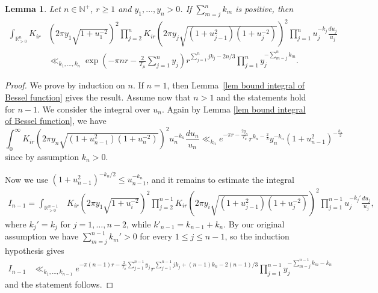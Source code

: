 \documentclass[10pt,a4paper]{amsart}
\newtheorem{lemma}{Lemma}
\newcommand{\N}{\mathbb{N}}
\newcommand{\R}{\mathbb{R}}
\begin{document}
\begin{lemma}
Let $n\in\N^+$, $r\geq1$ and $y_1,\dots,y_n>0$.
If
$\sum_{m=j}^nk_m$ is positive, then
\begin{align*}
\int_{\R_{>0}^n}K_{ir}&\left(2\pi y_1\sqrt{1+u_1^{-2}}\right)^2
\prod_{j=2}^nK_{ir}\left(2\pi y_j\sqrt{(1+u_{j-1}^2)(1+u_j^{-2})}\right)^2
\prod_{j=1}^nu_j^{-k_j}\frac{du_j}{u_j}\\
    &\ll_{k_1,\dots,k_n}
    \exp\left(-\pi nr-\frac2{T_\mu}\sum_{j=1}^n y_j\right)r^{\sum_{j=1}^n jk_j-2n/3}\prod_{j=1}^ny_j^{-\sum_{m=j}^nk_m}.
\end{align*}
\end{lemma}

\begin{proof}
We prove by induction on $n$. If $n=1$, then   Lemma~\ref{lem bound integral of Bessel function} 
gives the result.
Assume now that $n>1$ and the statements hold for $n-1$. We consider the integral over $u_n$. Again by Lemma \ref{lem bound integral of Bessel function}, we have
\[
\int_0^\infty K_{ir}\left(2\pi y_n\sqrt{(1+u_{n-1}^2)(1+u_n^{-2})}\right)^2u_n^{-k_n}\frac{du_n}{u_n}
\ll_{k_n}e^{-\pi r-\frac{2y_n}{T_\mu}}r^{k_n-\frac23}y_n^{-k_n}(1+u_{n-1}^2)^{-\frac{k_n}{2}}
\]
since by assumption $k_n>0$.

Now
we use $(1+u_{n-1}^2)^{-k_n/2}\leq u_{n-1}^{-k_n}$, and it remains
to estimate the integral 
\begin{align*}
I_{n-1}=\int_{\R_{>0}^{n-1}}&K_{ir}\left(2\pi y_1\sqrt{1+u_i^{-2}}\right)^2\prod_{j=2}^{n-1}K_{ir}\left(2\pi y_i\sqrt{(1+u_{j-1}^2)(1+u_j^{-2})}\right)^2\prod_{j=1}^{n-1}u_j^{-k_j'}\frac{du_j}{u_j},
\end{align*}
where $k_j'=k_j$ for $j=1,\dots,n-2$, while $k'_{n-1}=k_{n-1}+k_n$.  By
our original assumption we have 
$\sum_{m=j}^{n-1}k_m'>0$
for every $1\leq j\leq n-1$, so 
 the induction hypothesis gives
\begin{align*}
    I_{n-1}&\ll_{k_1,\dots,k_{n-1}}
    e^{-\pi(n-1)r-\frac2{T_\mu}\sum_{j=1}^{n-1}y_j}r^{\sum_{j=1}^{n-1} jk_j+(n-1)k_n-2(n-1)/3}\prod_{j=1}^{n-1}y_j^{-\sum_{m=j}^{n-1}k_m-k_n}
\end{align*}
and the statement follows.
\end{proof}
\end{document}
